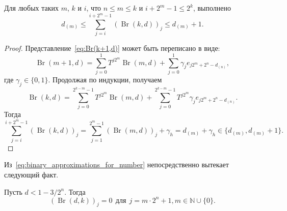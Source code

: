 \begin{lemma}
	\label{lem:sum_Br_k_c}
	Для любых таких $m$, $k$ и $i$, что $n \leq m \leq k$ и  $ i + 2^m - 1 \leq 2^k$,
	выполнено
	\begin{equation}
		d_{(m)} \leq \sum_{j=i}^{i+2^m-1} (\operatorname{Br}(k,d))_j \leq d_{(m)}+1
		.
	\end{equation}
\end{lemma}
\begin{proof}
	Представление~\eqref{eq:Br(k+1,d)} может быть переписано в виде:
	\begin{equation}
		\operatorname{Br}(m+1,d) = \sum_{j=0}^{1} T^{j2^m} \operatorname{Br}(m,d) + \sum_{j=0}^{1} \gamma_{j} e_{j 2^m+2^n-d_{(n)}}
		,
	\end{equation}
	где $\gamma_{j} \in \{0,1\}$.
	Продолжая по индукции, получаем
	\begin{equation}
		\operatorname{Br}(k,d) = \sum_{j=0}^{2^{k-m}-1} T^{j2^m} \operatorname{Br}(m,d) +
		\sum_{j=0}^{2^{k-m}-1} T^{j2^m} \gamma_{j} e_{j2^m+2^n-d_{(n)}}
		.
	\end{equation}
	Тогда
	\begin{equation}
		\sum_{j=i}^{i+2^m-1} (\operatorname{Br}(k,d))_j
		=
		\sum_{j=1}^{2^m-1} (\operatorname{Br}(m,d))_j
		+ \gamma_h
		=
		d_{(m)} + \gamma_h
		\in \{d_{(m)}, d_{(m)}+1\}
		.
	\end{equation}
\end{proof}

Из~\eqref{eq:binary_approximations_for_number} непосредственно вытекает следующий факт.
\begin{proposition}
	\label{prop:Br_has_nulls}
	Пусть $d<1-3/2^n$.
	Тогда
	\begin{equation}
		(\operatorname{Br}(d,k))_j = 0 ~~\mbox{для}~~j = m\cdot 2^n + 1, m\in\mathbb{N} \cup\{0\}
		.
	\end{equation}
\end{proposition}


